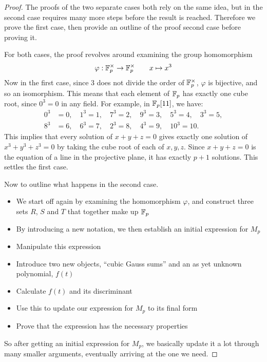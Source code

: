 \begin{proof}
The proofs of the two separate cases both rely on the same idea, but in the second case requires many more steps before the result is reached.
Therefore we prove the first case, then provide an outline of the proof second case before proving it.

For both cases, the proof revolves around examining the group homomorphism
$$\varphi: \mathbb{F}_{p}^{\times} \rightarrow \mathbb{F}_{p}^{\times} \qquad x \mapsto x^3$$
Now in the first case, since 3 does not divide the order of $\mathbb{F}_{p}^{\times}$, $\varphi$ is bijective, and so an isomorphism.
This means that each element of $\mathbb{F}_p$ has exactly one cube root, since $0^3=0$ in any field.
For example, in $\mathbb{F}_p[11]$, we have:
\begin{align*}
	0^3 &= 0,\quad
	1^3 = 1,\quad
	7^3 = 2,\quad
	9^3 = 3,\quad
	5^3 = 4,\quad
	3^3 = 5,\\
	8^3 &= 6,\quad
	6^3 = 7,\quad
	2^3 = 8,\quad
	4^3 = 9,\quad
	10^3 = 10.
\end{align*}
This implies that every solution of $x + y + z = 0$ gives exactly one solution of $x^3 + y^3 + z^3 = 0$ by taking the cube root of each of $x,y,z$.
Since $x + y + z = 0$ is the equation of a line in the projective plane, it has exactly $p+1$ solutions.
This settles the first case.

Now to outline what happens in the second case.
\begin{itemize}
\item We start off again by examining the homomorphism $\varphi$, and construct three sets $R$, $S$ and $T$ that together make up $\mathbb{F}_p$
\item By introducing a new notation, we then establish an initial expression for $M_p$
\item Manipulate this expression
\item Introduce two new objects, ``cubic Gauss sums'' and an as yet unknown polynomial, $f(t)$
\item Calculate $f(t)$ and its discriminant
\item Use this to update our expression for $M_p$ to its final form
\item Prove that the expression has the necessary properties
\end{itemize}
So after getting an initial expression for $M_p$, we basically update it a lot through many smaller arguments, eventually arriving at the one we need.


\end{proof}
